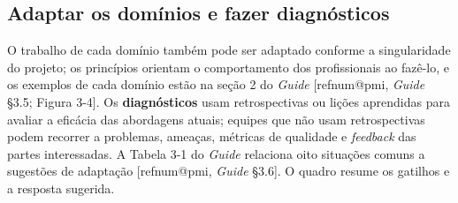 \documentclass[12pt,a4paper,article,oneside,english,brazil]{abntex2}
\makeatletter
\newcommand{\refnum}[1]{\csname refnum@#1\endcsname}
\makeatother
\begin{document}
\subsection{Adaptar os domínios e fazer diagnósticos}

O trabalho de cada domínio também pode ser adaptado conforme a singularidade do projeto; os princípios orientam o comportamento dos profissionais ao fazê-lo, e os exemplos de cada domínio estão na seção 2 do \textit{Guide} [\refnum{pmi}, \textit{Guide} §3.5; Figura 3-4]. Os \textbf{diagnósticos} usam retrospectivas ou lições aprendidas para avaliar a eficácia das abordagens atuais; equipes que não usam retrospectivas podem recorrer a problemas, ameaças, métricas de qualidade e \textit{feedback} das partes interessadas. A Tabela 3-1 do \textit{Guide} relaciona oito situações comuns a sugestões de adaptação [\refnum{pmi}, \textit{Guide} §3.6]. O quadro resume os gatilhos e a resposta sugerida.
\end{document}
